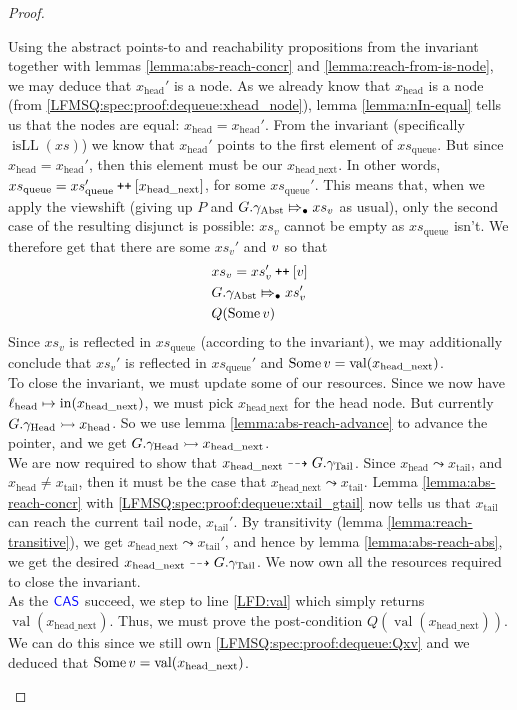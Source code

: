 \documentclass[a4paper, 10pt]{report}
\theoremstyle{definition}
\newcommand{\xsc}{xs}
\newcommand{\xsqueue}{xs_{\mathrm{queue}}}
\newcommand{\isLL}{\operatorname{isLL}}
\newcommand{\locN}[1]{\loc_{\mathrm{#1}}}
\newcommand{\lochead}{\locN{head}}
\newcommand{\nIn}[1]{\operatorname{in}(#1)}
\newcommand{\nVal}[1]{\operatorname{val}(#1)}
\newcommand{\node}{x}
\newcommand{\nodeN}[1]{\node_{\mathrm{#1}}}
\newcommand{\nodehead}{\nodeN{head}}
\newcommand{\nodetail}{\nodeN{tail}}
\newcommand{\nodeheadnext}{\nodeN{head\_next}}
\newcommand{\absvalue}{\val}
\newcommand{\absvalueList}{xs_v}
\newcommand{\Qg}{G}
\newcommand{\gabst}{\gname_{\mathrm{Abst}}}
\newcommand{\ghead}{\gname_{\mathrm{Head}}}
\newcommand{\gtail}{\gname_{\mathrm{Tail}}}
\newcommand\catenate{\mathbin{\text{\ttfamily\upshape ++}}}
\newcommand{\abstractstateauth}[2]{#1 \Mapsto_{\bullet} #2}
\newcommand{\reach}[2]{#1 \leadsto #2}
\newcommand{\ar}[2]{#1 \dashrightarrow #2}
\newcommand{\ap}[2]{#1 \rightarrowtail #2}
\begin{document}
\begin{proof}
\begin{itemize}
\begin{itemize}
      Using the abstract points-to and reachability propositions from the invariant together with lemmas \ref{lemma:abs-reach-concr} and \ref{lemma:reach-from-is-node}, we may deduce that $\nodehead'$ is a node. As we already know that $\nodehead$ is a node (from \ref{LFMSQ:spec:proof:dequeue:xhead_node}), lemma \ref{lemma:nIn-equal} tells us that the nodes are equal: $\nodehead = \nodehead'$. From the invariant (specifically $\isLL(\xsc)$) we know that $\nodehead'$ points to the first element of $\xsqueue$. But since $\nodehead = \nodehead'$, then this element must be our $\nodeheadnext$. In other words, $\xsqueue = \xsqueue' \catenate [\nodeheadnext]$, for some $\xsqueue'$.
      This means that, when we apply the viewshift (giving up $P$ and $\abstractstateauth{\Qg.\gabst}{\absvalueList}$ as usual), only the second case of the resulting disjunct is possible: $\absvalueList$ cannot be empty as $\xsqueue$ isn't. We therefore get that there are some $\absvalueList'$ and $\absvalue$ so that
      \begin{align}
        &\absvalueList = \absvalueList' \catenate [\absvalue]\\
        &\abstractstateauth{\Qg.\gabst}{\absvalueList'}\\
        &Q(\Some \absvalue)\label{LFMSQ:spec:proof:dequeue:Qxv}
      \end{align}
      Since $\absvalueList$ is reflected in $\xsqueue$ (according to the invariant), we may additionally conclude that $\absvalueList'$ is reflected in $\xsqueue'$ and $\Some \absvalue = \nVal{\nodeheadnext}$.\\
      To close the invariant, we must update some of our resources. Since we now have $\lochead \mapsto \nIn{\nodeheadnext}$, we must pick $\nodeheadnext$ for the head node. But currently $\ap{\Qg.\ghead}{\nodehead}$. So we use lemma \ref{lemma:abs-reach-advance} to advance the pointer, and we get $\ap{\Qg.\ghead}{\nodeheadnext}$.\\
      We are now required to show that $\ar{\nodeheadnext}{\Qg.\gtail}$. Since $\reach{\nodehead}{\nodetail}$, and $\nodehead \neq \nodetail$, then it must be the case that $\reach{\nodeheadnext}{\nodetail}$. Lemma \ref{lemma:abs-reach-concr} with \ref{LFMSQ:spec:proof:dequeue:xtail_gtail} now tells us that $\nodetail$ can reach the current tail node, $\nodetail'$. By transitivity (lemma \ref{lemma:reach-transitive}), we get $\reach{\nodeheadnext}{\nodetail'}$, and hence by lemma \ref{lemma:abs-reach-abs}, we get the desired $\ar{\nodeheadnext}{\Qg.\gtail}$. We now own all the resources required to close the invariant.\\
      As the $\textsf{\color{blue} CAS}$ succeed, we step to line \ref{LFD:val} which simply returns $\nVal{\nodeheadnext}$. Thus, we must prove the post-condition $Q(\nVal{\nodeheadnext})$. We can do this since we still own \ref{LFMSQ:spec:proof:dequeue:Qxv} and we deduced that $\Some \absvalue = \nVal{\nodeheadnext}$.
    \end{itemize}


\end{itemize}
\end{proof}
\end{document}
